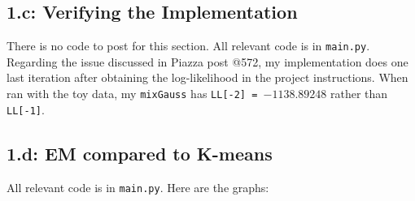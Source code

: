 \documentclass{article}
\begin{document}
\subsection*{1.c: Verifying the Implementation} There is no code to post for this section. All relevant code is in \texttt{main.py}. \\
Regarding the issue discussed in Piazza post @572, my implementation does one last iteration after obtaining the log-likelihood in the project instructions. When ran with the toy data, my \texttt{mixGauss} has \texttt{LL[-2] = }$-1138.89248$ rather than \texttt{LL[-1]}.
\pagebreak
\subsection*{1.d: EM compared to K-means} All relevant code is in \texttt{main.py}. Here are the graphs:
\end{document}
